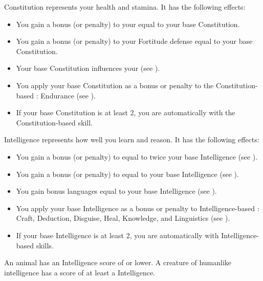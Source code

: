         \label{Constitution}
        {
            Constitution represents your health and stamina.
            It has the following effects:
            \begin{itemize}
                \item You gain a bonus (or penalty) to your  equal to your base Constitution.
                \item You gain a bonus (or penalty) to your Fortitude defense equal to your base Constitution.
                \item Your base Constitution influences your  (see ).
                \item You apply your base Constitution as a bonus or penalty to the Constitution-based : Endurance (see ).
                \item If your base Constitution is at least 2, you are automatically  with the Constitution-based skill.
            \end{itemize}
        }

        \label{Intelligence}
        {
            Intelligence represents how well you learn and reason.
            It has the following effects:

            \begin{itemize}
                \item You gain a bonus (or penalty) to  equal to twice your base Intelligence (see ).
                \item You gain a bonus (or penalty) to  equal to your base Intelligence (see ).
                \item You gain bonus languages equal to your base Intelligence (see ).
                \item You apply your base Intelligence as a bonus or penalty to Intelligence-based : Craft, Deduction, Disguise, Heal, Knowledge, and Linguistics (see ).
                \item If your base Intelligence is at least 2, you are automatically  with Intelligence-based skills.
            \end{itemize}

            \par An animal has an Intelligence score of  or lower.
            A creature of humanlike intelligence has a score of at least a  Intelligence.
        }

